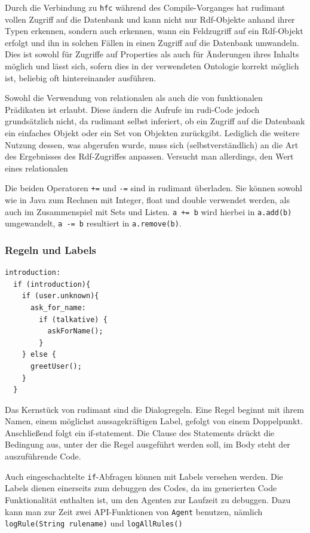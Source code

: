 Durch die Verbindung zu \texttt{hfc} während des Compile-Vorganges hat rudimant
vollen Zugriff auf die Datenbank und kann nicht nur Rdf-Objekte anhand ihrer
Typen erkennen, sondern auch erkennen, wann ein Feldzugriff auf ein Rdf-Objekt
erfolgt und ihn in solchen Fällen in einen Zugriff auf die Datenbank
umwandeln. Dies ist sowohl für Zugriffe auf Properties als auch für Änderungen
ihres Inhalts möglich und lässt sich, sofern dies in der verwendeten Ontologie
korrekt möglich ist, beliebig oft hintereinander ausführen.

Sowohl die Verwendung von relationalen als auch die von funktionalen Prädikaten
ist erlaubt. Diese ändern die Aufrufe im rudi-Code jedoch grundsätzlich nicht,
da rudimant selbst inferiert, ob ein Zugriff auf die Datenbank ein einfaches
Objekt oder ein Set von Objekten zurückgibt. Lediglich die weitere Nutzung
dessen, was abgerufen wurde, muss sich (selbstverständlich) an die Art des
Ergebnisses des Rdf-Zugriffes anpassen. Versucht man allerdings, den Wert eines
relationalen

Die beiden Operatoren \texttt{+=} und \texttt{-=} sind in rudimant
überladen. Sie können sowohl wie in Java zum Rechnen mit Integer, float und
double verwendet werden, als auch im Zusammenspiel mit Sets und
Listen. \texttt{a += b} wird hierbei in \texttt{a.add(b)} umgewandelt,
\texttt{a -= b} resultiert in \texttt{a.remove(b)}.

\subsubsection{Regeln und Labels}

\begin{small}
\begin{verbatim}
introduction:
  if (introduction){
    if (user.unknown){
      ask_for_name:
        if (talkative) {
          askForName();
        }
    } else {
      greetUser();
    }
  }
\end{verbatim}
\end{small}

Das Kernstück von rudimant sind die Dialogregeln. Eine Regel beginnt mit ihrem
Namen, einem möglichst aussagekräftigen Label, gefolgt von einem
Doppelpunkt. Anschließend folgt ein if-statement. Die Clause des Statements
drückt die Bedingung aus, unter der die Regel ausgeführt werden soll, im Body
steht der auszuführende Code.

Auch eingeschachtelte \texttt{if}-Abfragen können mit Labels versehen werden.
Die Labels dienen einerseits zum debuggen des Codes, da im generierten Code
Funktionalität enthalten ist, um den Agenten zur Laufzeit zu debuggen. Dazu
kann man zur Zeit zwei API-Funktionen von \texttt{Agent} benutzen, nämlich
\texttt{logRule(String rulename)} und \texttt{logAllRules()}

